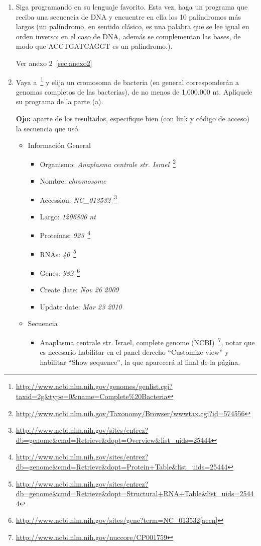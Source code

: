 \begin{enumerate}

	\item Siga programando en su lenguaje favorito. Esta vez, haga un programa que reciba una
		secuencia de DNA y encuentre en ella los 10 palíndromos más largos (un palíndromo, en
		sentido clásico, es una palabra que se lee igual en orden inverso; en el caso de DNA, además se
		complementan las bases, de modo que ACCTGATCAGGT es un palíndromo.).

		
		Ver anexo 2~\ref{sec:anexo2}

	\item Vaya a~\footnote{\url{http://www.ncbi.nlm.nih.gov/genomes/genlist.cgi?taxid=2g\&type=0\&name=Complete\%20Bacteria}}
		y elija un cromosoma de bacteria (en general corresponderán a genomas completos de las bacterias),
		de no menos de 1.000.000 nt. Aplíquele su programa de la parte (a).

		\textbf{Ojo:} aparte de los resultados, especifique bien (con link y código de acceso) la secuencia que usó.

		\begin{itemize}
			\item Información General
				\begin{itemize}
					\item Organismo: \emph{Anaplasma centrale str. Israel}~\footnote{\url{http://www.ncbi.nlm.nih.gov/Taxonomy/Browser/wwwtax.cgi?id=574556}}
					\item Nombre: \emph{chromosome}
					\item Accession: \emph{NC\_013532}~\footnote{\url{http://www.ncbi.nlm.nih.gov/sites/entrez?db=genome&cmd=Retrieve&dopt=Overview&list_uids=25444}}
					\item Largo: \emph{1206806 nt}
					\item Proteínas:	\emph{923}~\footnote{\url{http://www.ncbi.nlm.nih.gov/sites/entrez?db=genome&cmd=Retrieve&dopt=Protein+Table&list_uids=25444}}
					\item RNAs: \emph{40}~\footnote{\url{http://www.ncbi.nlm.nih.gov/sites/entrez?db=genome&cmd=Retrieve&dopt=Structural+RNA+Table&list_uids=25444}}
					\item Genes: \emph{982}~\footnote{\url{http://www.ncbi.nlm.nih.gov/sites/gene?term=NC_013532[accn]}}
					\item Create date: \emph{Nov 26 2009}
					\item Update date: \emph{Mar 23 2010}
				\end{itemize}
			\item Secuencia
				\begin{itemize}
					\item Anaplasma centrale str. Israel, complete genome (NCBI)~\footnote{\url{http://www.ncbi.nlm.nih.gov/nuccore/CP001759}},
						notar que es necesario habilitar en el panel derecho ``Customize view'' y habilitar ``Show sequence'',
						la que aparecerá al final de la página.\\


\end{itemize}
\end{itemize}
\end{enumerate}
